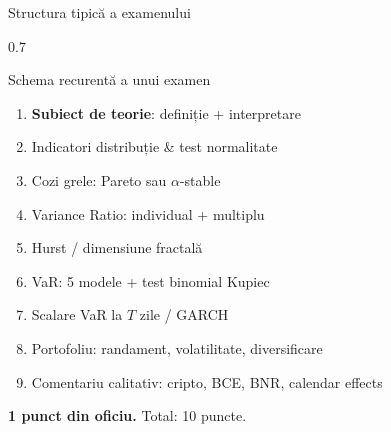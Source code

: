 \documentclass[9pt, aspectratio=169, t]{beamer}
\begin{document}
\begin{frame}{Structura tipică a examenului}
	\begin{cminipage}{0.7\textwidth}
		\begin{alertblock}{Schema recurentă a unui examen}
			\begin{enumerate}\setlength{\itemsep}{1pt}
				\item \textbf{Subiect de teorie}: definiție + interpretare 
				\item Indicatori distribuție \& test normalitate
				\item Cozi grele: Pareto sau $\alpha$-stable
				\item Variance Ratio: individual + multiplu
				\item Hurst / dimensiune fractală
				\item VaR: 5 modele + test binomial Kupiec
				\item Scalare VaR la $T$ zile / GARCH
				\item Portofoliu: randament, volatilitate, diversificare
				\item Comentariu calitativ: cripto, BCE, BNR, calendar effects
			\end{enumerate}
			\textbf{1 punct din oficiu.} Total: 10 puncte.
		\end{alertblock}
	\end{cminipage}
\end{frame}
\end{document}
